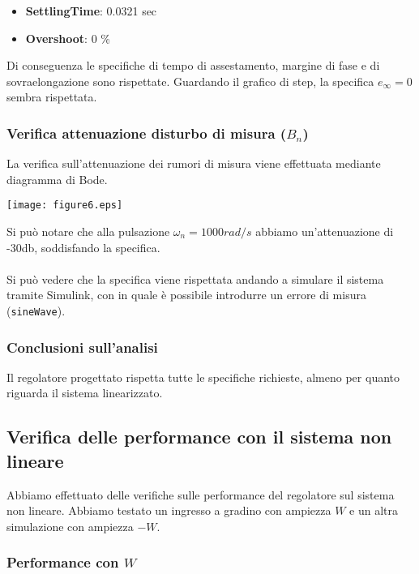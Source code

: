 \documentclass{article}
\begin{document}
\begin{itemize}
    \item \textbf{SettlingTime}: 0.0321 sec
    \item \textbf{Overshoot}: 0 \%
\end{itemize}

Di conseguenza le specifiche di tempo di assestamento, margine di fase e di sovraelongazione sono rispettate. Guardando il grafico di step, la specifica $e_\infty=0$ sembra rispettata. 

\subsubsection{Verifica attenuazione disturbo di misura ($B_n$)}

La verifica sull'attenuazione dei rumori di misura viene effettuata mediante diagramma di Bode.

\begin{center}
    \texttt{[image: figure6.eps]}
\end{center}

Si può notare che alla pulsazione $\omega_n=1000 rad/s$ abbiamo un'attenuazione di -30db, soddisfando la specifica.\\\\

Si può vedere che la specifica viene rispettata andando a simulare il sistema tramite Simulink, con in quale è possibile introdurre un errore di misura (\texttt{sineWave}).

\subsubsection{Conclusioni sull'analisi}

Il regolatore progettato rispetta tutte le specifiche richieste, almeno per quanto riguarda il sistema linearizzato.

\newpage

\subsection{Verifica delle performance con il sistema non lineare}
Abbiamo effettuato delle verifiche sulle performance del regolatore sul sistema non lineare. Abbiamo testato un ingresso a gradino con ampiezza $W$ e un altra simulazione con ampiezza $-W$.

\subsubsection{Performance con $W$}
\end{document}
